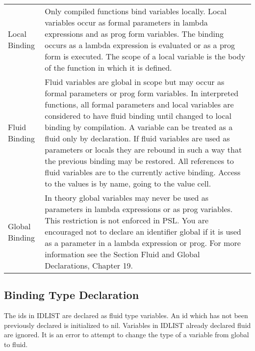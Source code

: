 \begin{tabular}{lp{11.0cm}}
Local Binding & Only  compiled  functions  bind variables locally.
              Local variables  occur  as  formal  parameters  in
              lambda  expressions  and  as  prog form variables.
              The binding  occurs  as  a  lambda  expression  is
              evaluated  or  as  a  prog  form is executed.  The
              scope of a local  variable  is  the  body  of  the
              function in which it is defined.\\

Fluid Binding & Fluid  variables are global in scope but may occur
              as formal parameters or prog form variables.    In
              interpreted  functions,  all formal parameters and
              local  variables  are  considered  to  have  fluid
              binding   until   changed   to  local  binding  by
              compilation.  A variable can be treated as a fluid
              only by declaration.  If fluid variables are  used
              as parameters or locals they are rebound in such a
              way  that  the  previous  binding may be restored.
              All references  to  fluid  variables  are  to  the
              currently active binding.  Access to the values is
              by name, going to the value cell.\\

Global Binding & In  theory  global variables may never be used as
              parameters  in  lambda  expressions  or  as   prog
              variables.   This  restriction  is not enforced in
              PSL.    You  are  encouraged  not  to  declare  an
              identifier  global if it is used as a parameter in
              a lambda expression or prog.  For more information
              see the Section  Fluid  and  Global  Declarations,
              Chapter 19.\\
\end{tabular}
\subsection{Binding Type Declaration}


{    The   ids in IDLIST are declared as fluid type variables. An
    id which has not been previously declared is initialized  to
    nil.    Variables  in  IDLIST  already  declared  fluid  are
    ignored.  It is an error to attempt to change the type of  a
    variable from global to fluid.
}

